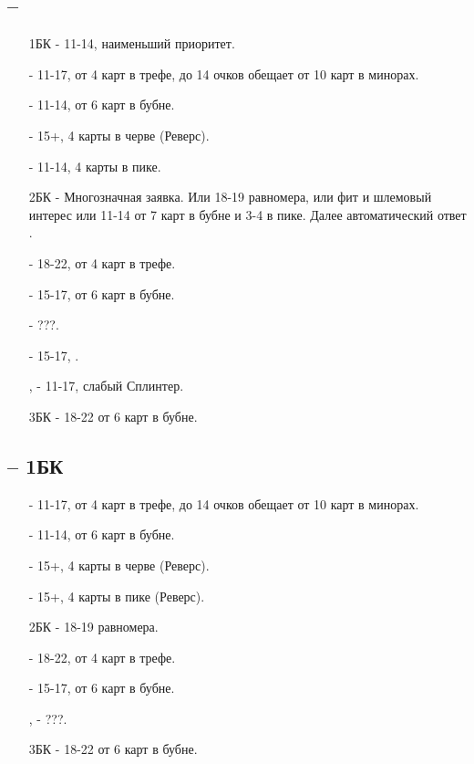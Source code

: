\documentclass{article}
\begin{document}
\subsection{ -- }
\begin{enumerate}
    \item[1БК] - 11-14, наименьший приоритет.
    \item[\cl{2}] - 11-17, от 4 карт в трефе, до 14 очков обещает от 10 карт в минорах. 
    \item[\di{2}] - 11-14, от 6 карт в бубне.
    \item[\he{2}] - 15+, 4 карты в черве (Реверс).
    \item[\sp{2}] - 11-14, 4 карты в пике.
    \item[2БК] - Многозначная заявка. Или 18-19 равномера, или фит и шлемовый интерес или 11-14 от 7 карт в бубне и 3-4 в пике. Далее автоматический ответ .
    \item[\cl{3}] - 18-22, от 4 карт в трефе.
    \item[\di{3}] - 15-17, от 6 карт в бубне.
    \item[\he{3}] - ???.
    \item[\sp{3}] - 15-17, .
    \item[\cl{4}, \he{4}] - 11-17, слабый Сплинтер.
    \item[3БК] - 18-22 от 6 карт в бубне.
\end{enumerate}
\subsection{ -- 1БК}
\begin{enumerate}
    \item[\cl{2}] - 11-17, от 4 карт в трефе, до 14 очков обещает от 10 карт в минорах. 
    \item[\di{2}] - 11-14, от 6 карт в бубне.
    \item[\he{2}] - 15+, 4 карты в черве (Реверс).
    \item[\sp{2}] - 15+, 4 карты в пике (Реверс).
    \item[2БК] - 18-19 равномера.
    \item[\cl{3}] - 18-22, от 4 карт в трефе.
    \item[\di{3}] - 15-17, от 6 карт в бубне.
    \item[\he{3}, \sp{3}] - ???.
    \item[3БК] - 18-22 от 6 карт в бубне.
\end{enumerate}
\end{document}
